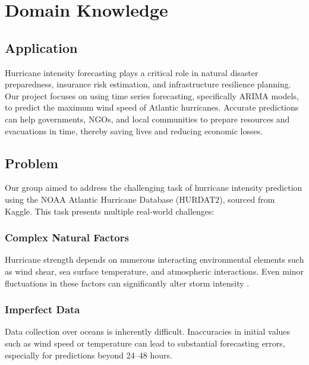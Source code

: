 %
%
%









	
	\chapter{Domain Knowledge}
	


\section{Application}
Hurricane intensity forecasting plays a critical role in natural disaster preparedness, insurance risk estimation, and infrastructure resilience planning. Our project focuses on using time series forecasting, specifically ARIMA models, to predict the maximum wind speed of Atlantic hurricanes. Accurate predictions can help governments, NGOs, and local communities to prepare resources and evacuations in time, thereby saving lives and reducing economic losses.

\section{Problem}
Our group aimed to address the challenging task of hurricane intensity prediction using the NOAA Atlantic Hurricane Database (HURDAT2), sourced from Kaggle. This task presents multiple real-world challenges:

\subsection{Complex Natural Factors}
Hurricane strength depends on numerous interacting environmental elements such as wind shear, sea surface temperature, and atmospheric interactions. Even minor fluctuations in these factors can significantly alter storm intensity \cite{emanuel2003tropical, kaplan2003large}.

\subsection{Imperfect Data}
Data collection over oceans is inherently difficult. Inaccuracies in initial values such as wind speed or temperature can lead to substantial forecasting errors, especially for predictions beyond 24–48 hours.

